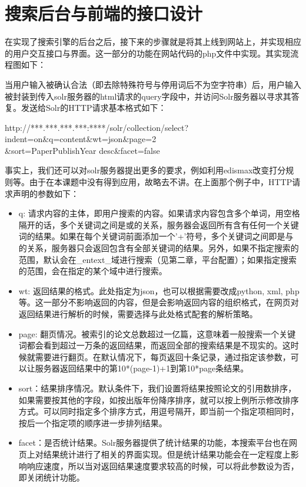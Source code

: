 
\chapter{搜索后台与前端的接口设计}
\label{chap:c4}

在实现了搜索引擎的后台之后，接下来的步骤就是将其上线到网站上，并实现相应的用户交互接口与界面。这一部分的功能在网站代码的php文件中实现。其实现流程图如下：

\begin{figure}[!htp]
    \centering
    \resizebox{5.5cm}{!}{}
\end{figure}

当用户输入被确认合法（即去除特殊符号与停用词后不为空字符串）后，用户输入被封装到传入solr服务器的html请求的query字段中，并访问Solr服务器以寻求其答复。发送给Solr的HTTP请求基本格式如下：

http://***.***.***.***:****/solr/collection/select?indent=on\&q=content\&wt=json\&page=2\\
\&sort=PaperPublishYear desc\&facet=false

事实上，我们还可以对solr服务器提出更多的要求，例如利用edismax改变打分规则等。由于在本课题中没有得到应用，故略去不讲。在上面那个例子中，HTTP请求声明的参数如下：

\begin{itemize}
\item q: 请求内容的主体，即用户搜索的内容。如果请求内容包含多个单词，用空格隔开的话，多个关键词之间是或的关系，服务器会返回所有含有任何一个关键词的结果。如果在每个关键词前面添加一个'+'符号，多个关键词之间即是与的关系，服务器只会返回包含有全部关键词的结果。另外，如果不指定搜索的范围，默认会在\_entext\_域进行搜索（见第二章，平台配置）；如果指定搜索的范围，会在指定的某个域中进行搜索。
\item wt: 返回结果的格式。此处指定为json，也可以根据需要改成python, xml, php等。这一部分不影响返回的内容，但是会影响返回内容的组织格式，在网页对返回结果进行解析的时候，需要选择与此处格式配套的解析策略。
\item page: 翻页情况。被索引的论文总数超过一亿篇，这意味着一般搜索一个关键词都会看到超过一万条的返回结果，而返回全部的搜索结果是不现实的。这时候就需要进行翻页。在默认情况下，每页返回十条记录，通过指定该参数，可以让服务器返回结果中的第10*(page-1)+1到第10*page条结果。
\item sort：结果排序情况。默认条件下，我们设置将结果按照论文的引用数排序，如果需要按其他的字段，如按出版年份降序排序，就可以按上例所示修改排序方式。可以同时指定多个排序方式，用逗号隔开，即当前一个指定项相同时，按后一个指定项的顺序进一步排列结果。
\item facet：是否统计结果。Solr服务器提供了统计结果的功能，本搜索平台也在网页上对结果统计进行了相关的界面实现。但是统计结果功能会在一定程度上影响响应速度，所以当对返回结果速度要求较高的时候，可以将此参数设为否，即关闭统计功能。
\end{itemize}

